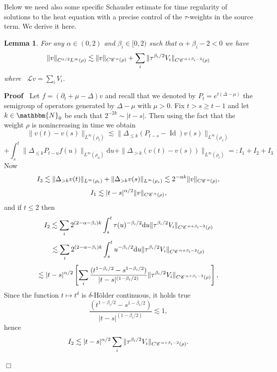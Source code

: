 \documentclass[a4paper,11pt]{article}
\newcommand{\backassign}{=:}
\newcommand{\mathd}{\mathrm{d}}
\newcommand{\tmop}[1]{\ensuremath{\operatorname{#1}}}
\newenvironment{proof}{\noindent\textbf{Proof\ }}{\hspace*{\fill}$\Box$\medskip}
\newtheorem{lemma}[theorem]{Lemma}
\numberwithin{equation}{section}
\newcommand{\CC}{\mathscr{C} \hspace{.1em}}
\newcommand{\LL}{\mathscr{L}}
\newcommand{\8}{\infty}
\begin{document}
Below we need also some specific Schauder estimate for time regularity of
solutions to the heat equation with a precise control of the $\tau$-weights in
the source term. We derive it here.

\begin{lemma}
  \label{lemma:time-tau-schauder}For any $\alpha \in (0, 2)$ and $\beta_i \in
  [0, 2)$ such that $\alpha + \beta_i - 2 < 0$ we have
  \[ \| v \|_{C^{\alpha / 2} L^{\infty} (\rho)} \lesssim \| v \|_{C
     \CC^{\alpha} (\rho)} + \sum_i \| \tau^{\beta_i / 2} V_i \|_{C \CC^{\alpha
     + \beta_i - 2} (\rho)} \]
  where \ $\LL v = \sum_i V_i$.
\end{lemma}

\begin{proof}
  Let $f = (\partial_t + \mu - \Delta) v$ and recall that we denoted by $P_{t}=e^{t(\Delta-\mu)}$ the  semigroup of operators generated by $\Delta-\mu$ with $\mu>0$. Fix $t>s \geqslant t-1$ and let $k \in \mathbbm{N}_0$ be such that $2^{- 2 k} \sim | t
  - s |$. Then using the fact that the weight $\rho$ is nonincreasing in time we obtain
  \[ \|v (t) - v (s) \|_{L^{\infty} (\rho_{t})} \lesssim \| \Delta_{\leqslant k}
     (P_{t - s} - \tmop{Id}) v (s) \|_{L^{\infty} (\rho_{s})} \]
  \[ + \int_s^t \| \Delta_{\leqslant k} P_{t - u} f (u) \|_{L^{\infty} (\rho_{u})}
     \mathd u +  \|\Delta_{>k} (v(t)-v(s)) \|_{ L^{\infty} (\rho_{t})} \backassign I_1
     + I_2 + I_3 \]
  Now
  $$
  I_{3}\lesssim \|\Delta_{>k}v(t) \|_{L^{\infty} (\rho_{t})} +\|\Delta_{>k}v(s) \|_{L^{\infty} (\rho_{s})} \lesssim 2^{- \alpha k} \| v \|_{C \CC^{\alpha} (\rho)},
  $$
  \[ I_1 \lesssim | t - s |^{\alpha / 2} \| v \|_{C \CC^{\alpha} (\rho)}, \]
  and if $t\le 2$ then
  \[ I_2 \lesssim \sum_i 2^{(2 - \alpha - \beta_i) k} \int_s^t \tau (u)^{-
     \beta_i / 2} \mathd u \| \tau^{\beta_i / 2} V_i \|_{C \CC^{\alpha +
     \beta_i - 2} (\rho)} \]
  \[ \lesssim \sum_i 2^{(2 - \alpha - \beta_i) k} 
     \int_s^t u^{- \beta_i / 2} \mathd u \| \tau^{\beta_i / 2} V_i \|_{C
     \CC^{\alpha + \beta_i - 2} (\rho)} \]
  \[ \lesssim | t - s |^{\alpha / 2} \left[ \sum_i \frac{(t^{1 - \beta_i / 2}
     - s^{1 - \beta_i / 2})}{| t - s |^{(1 - \beta_i / 2)}} \| \tau^{\beta_i /
     2} V_i \|_{C \CC^{\alpha + \beta_i - 2} (\rho)} \right], \]
Since the function $t\mapsto t^{\delta}$ is $\delta$-H\"older continuous, it holds true
  \[ \frac{(t^{1 - \beta_i / 2} - s^{1 - \beta_i / 2})}{| t - s |^{(1 -
     \beta_i / 2)}} \lesssim 1, \]
  hence
  \[ I_2 \lesssim | t - s |^{\alpha / 2} \sum_i \| \tau^{\beta_i / 2} V_i
     \|_{C \CC^{\alpha + \beta_i - 2} (\rho)} . \]

\end{proof}
\end{document}
